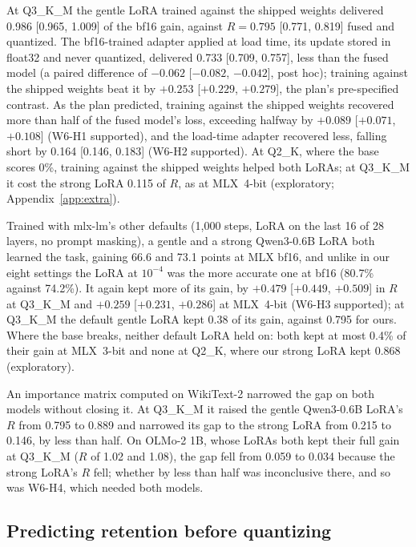 \documentclass[10pt]{article}
\begin{document}
At Q3\_K\_M the gentle LoRA trained against the shipped weights delivered 0.986 [0.965, 1.009] of the bf16 gain, against $R = 0.795$ [0.771, 0.819] fused and quantized. The bf16-trained adapter applied at load time, its update stored in float32 and never quantized, delivered 0.733 [0.709, 0.757], less than the fused model (a paired difference of $-0.062$ [$-0.082$, $-0.042$], post hoc); training against the shipped weights beat it by $+0.253$ [$+0.229$, $+0.279$], the plan's pre-specified contrast. As the plan predicted, training against the shipped weights recovered more than half of the fused model's loss, exceeding halfway by $+0.089$ [$+0.071$, $+0.108$] (W6-H1 supported), and the load-time adapter recovered less, falling short by 0.164 [0.146, 0.183] (W6-H2 supported). At Q2\_K, where the base scores 0\%, training against the shipped weights helped both LoRAs; at Q3\_K\_M it cost the strong LoRA 0.115 of $R$, as at MLX~4-bit (exploratory; Appendix~\ref{app:extra}).

Trained with mlx-lm's other defaults (1,000 steps, LoRA on the last 16 of 28 layers, no prompt masking), a gentle and a strong Qwen3-0.6B LoRA both learned the task, gaining 66.6 and 73.1 points at MLX bf16, and unlike in our eight settings the LoRA at $10^{-4}$ was the more accurate one at bf16 (80.7\% against 74.2\%). It again kept more of its gain, by $+0.479$ [$+0.449$, $+0.509$] in $R$ at Q3\_K\_M and $+0.259$ [$+0.231$, $+0.286$] at MLX~4-bit (W6-H3 supported); at Q3\_K\_M the default gentle LoRA kept 0.38 of its gain, against 0.795 for ours. Where the base breaks, neither default LoRA held on: both kept at most 0.4\% of their gain at MLX~3-bit and none at Q2\_K, where our strong LoRA kept 0.868 (exploratory).

An importance matrix computed on WikiText-2 narrowed the gap on both models without closing it. At Q3\_K\_M it raised the gentle Qwen3-0.6B LoRA's $R$ from 0.795 to 0.889 and narrowed its gap to the strong LoRA from 0.215 to 0.146, by less than half. On OLMo-2 1B, whose LoRAs both kept their full gain at Q3\_K\_M ($R$ of 1.02 and 1.08), the gap fell from 0.059 to 0.034 because the strong LoRA's $R$ fell; whether by less than half was inconclusive there, and so was W6-H4, which needed both models.

\subsection{Predicting retention before quantizing}
\label{sec:predictor}
\end{document}
